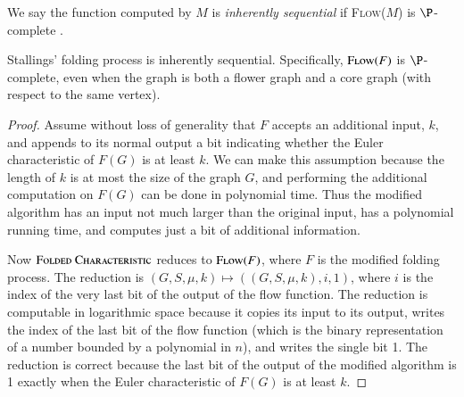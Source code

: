 \documentclass{elsarticlenonatbib}
\newcommand{\FC}{\textsc{Folded Characteristic}}
\newcommand{\Flow}{\textsc{Flow($F$)}}
\begin{document}
We say the function computed by $M$ is \emph{inherently sequential} if \textsc{Flow($M$)} is $\P$-complete \autocite[Definition~8.2.2]{ghr95}.

\begin{theorem}
  Stallings' folding process is inherently sequential.
  Specifically, $\Flow$ is $\P$-complete, even when the graph is both a flower graph and a core graph (with respect to the same vertex).
\end{theorem}
\begin{proof}
  Assume without loss of generality that $F$ accepts an additional input, $k$, and appends to its normal output a bit indicating whether the Euler characteristic of $F(G)$ is at least $k$.
  We can make this assumption because the length of $k$ is at most the size of the graph $G$, and performing the additional computation on $F(G)$ can be done in polynomial time.
  Thus the modified algorithm has an input not much larger than the original input, has a polynomial running time, and computes just a bit of additional information.

  Now $\FC$ reduces to $\Flow$, where $F$ is the modified folding process.
  The reduction is $(G, S, \mu, k) \mapsto ((G, S, \mu, k), i, 1)$, where $i$ is the index of the very last bit of the output of the flow function.
  The reduction is computable in logarithmic space because it copies its input to its output, writes the index of the last bit of the flow function (which is the binary representation of a number bounded by a polynomial in $n$), and writes the single bit 1.
  The reduction is correct because the last bit of the output of the modified algorithm is 1 exactly when the Euler characteristic of $F(G)$ is at least $k$.
\end{proof}

\printbibliography
\end{document}
